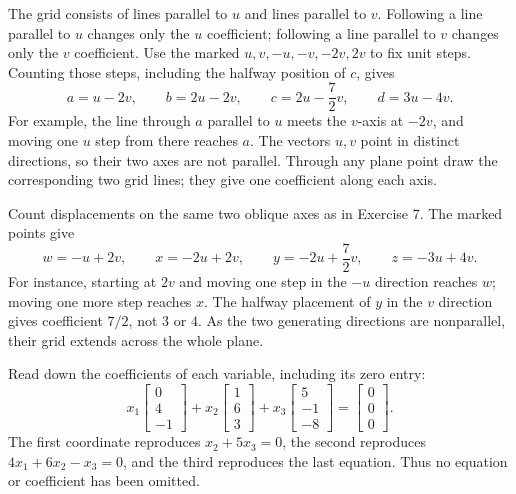 The grid consists of lines parallel to $u$ and lines parallel to $v$.
Following a line parallel to $u$ changes only the $u$ coefficient;
following a line parallel to $v$ changes only the $v$ coefficient.
Use the marked $u,v,-u,-v,-2v,2v$ to fix unit steps. Counting those
steps, including the halfway position of $c$, gives
\[
a=u-2v,\qquad b=2u-2v,\qquad
c=2u-\frac72v,\qquad d=3u-4v.
\]
For example, the line through $a$ parallel to $u$ meets the $v$-axis
at $-2v$, and moving one $u$ step from there reaches $a$.
The vectors $u,v$ point in distinct directions, so their two axes are not
parallel. Through any plane point draw the corresponding two grid lines;
they give one coefficient along each axis.

Count displacements on the same two oblique axes as in Exercise 7.
The marked points give
\[
w=-u+2v,\qquad x=-2u+2v,\qquad
y=-2u+\frac72v,\qquad z=-3u+4v.
\]
For instance, starting at $2v$ and moving one step in the $-u$
direction reaches $w$; moving one more step reaches $x$. The halfway
placement of $y$ in the $v$ direction gives coefficient $7/2$, not $3$
or $4$. As the two generating directions are nonparallel, their grid
extends across the whole plane.

Read down the coefficients of each variable, including its zero entry:
\[
x_1\begin{bmatrix}0\\4\\-1\end{bmatrix}
+x_2\begin{bmatrix}1\\6\\3\end{bmatrix}
+x_3\begin{bmatrix}5\\-1\\-8\end{bmatrix}
=\begin{bmatrix}0\\0\\0\end{bmatrix}.
\]
The first coordinate reproduces $x_2+5x_3=0$, the second reproduces
$4x_1+6x_2-x_3=0$, and the third reproduces the last equation.
Thus no equation or coefficient has been omitted.

